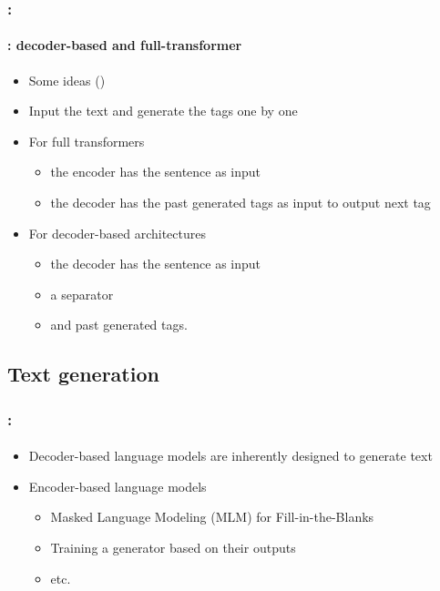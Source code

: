 \documentclass[xcolor=table]{beamer}
\begin{document}
\begin{frame}
	\frametitle{\insertshortsubtitle: \insertsection}
	\framesubtitle{\insertsubsection: decoder-based and full-transformer}
	
	\begin{itemize}
		\item Some ideas ()
		\item Input the text and generate the tags one by one
		\item For full transformers
		\begin{itemize}
			\item the encoder has the sentence as input 
			\item the decoder has the past generated tags as input to output next tag  
		\end{itemize}
		\item For decoder-based architectures
		\begin{itemize}
			\item the decoder has the sentence as input 
			\item a separator
			\item and past generated tags.
		\end{itemize}
	\end{itemize}
	
	
\end{frame}


\subsection{Text generation}

\begin{frame}
	\frametitle{\insertshortsubtitle: \insertsection}
	\framesubtitle{\insertsubsection}
	
	\begin{itemize}
		\item Decoder-based language models are inherently designed to generate text
		\item Encoder-based language models
		\begin{itemize}
			\item Masked Language Modeling (MLM) for Fill-in-the-Blanks
			\item Training a generator based on their outputs
			\item etc.
		\end{itemize}
	\end{itemize}
	
\end{frame}



	
\end{document}
